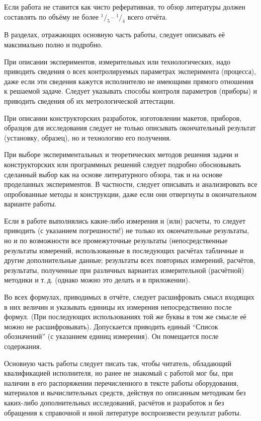 \documentclass[utf8,14pt, coursreport]{G7-32}
\begin{document}
Если работа не ставится как чисто реферативная, то обзор литературы должен составлять по объёму не более $^1/_5$\,--\,$^1/_4$ всего отчёта.

В разделах, отражающих основную часть работы, следует описывать её максимально полно и подробно.

При описании экспериментов, измерительных или технологических, надо приводить сведения о всех контролируемых параметрах эксперимента (процесса), даже если эти сведения кажутся исполнителю не имеющими прямого отношения к решаемой задаче. Следует указывать способы контроля параметров (приборы) и приводить сведения об их метрологической аттестации.

При описании конструкторских разработок, изготовлении макетов, приборов, образцов для исследования следует не только описывать окончательный результат (установку, образец), но и технологию его получения.

При выборе экспериментальных и теоретических методов решения задачи и конструкторских или программных решений следует подробно обосновывать сделанный выбор как на основе литературного обзора, так и на основе проделанных экспериментов. В частности, следует описывать и анализировать все опробованные методы и конструкции, даже если они отвергнуты в окончательном варианте работы.

Если в работе выполнялись какие-либо измерения и (или) расчеты, то следует приводить (с указанием погрешности!) не только их окончательные результаты, но и по возможности все промежуточные результаты (непосредственные результаты измерений, использованные в последующих расчётах табличные и другие дополнительные данные; результаты всех повторных измерений, расчётов, результаты, полученные при различных вариантах измерительной (расчётной) методики и т.\,д. (однако можно это делать и в приложении).

Во всех формулах, приводимых в отчёте, следует расшифровать смысл входящих в них величин и указывать единицы их измерения непосредственно после формул. (При последующих использованиях той же буквы в том же смысле её можно не расшифровывать). Допускается приводить единый ``Список обозначений'' (с указанием единиц измерения). Он помещается после содержания.

Основную часть работы следует писать так, чтобы читатель, обладающий квалификацией исполнителя, но ранее не знакомый с работой мог бы, при наличии в его распоряжении перечисленного в тексте работы оборудования, материалов и вычислительных средств, действуя по описанным методикам без каких-либо дополнительных исследований, расчётов и разработок и без обращения к справочной и иной литературе воспроизвести результат работы.
\end{document}
